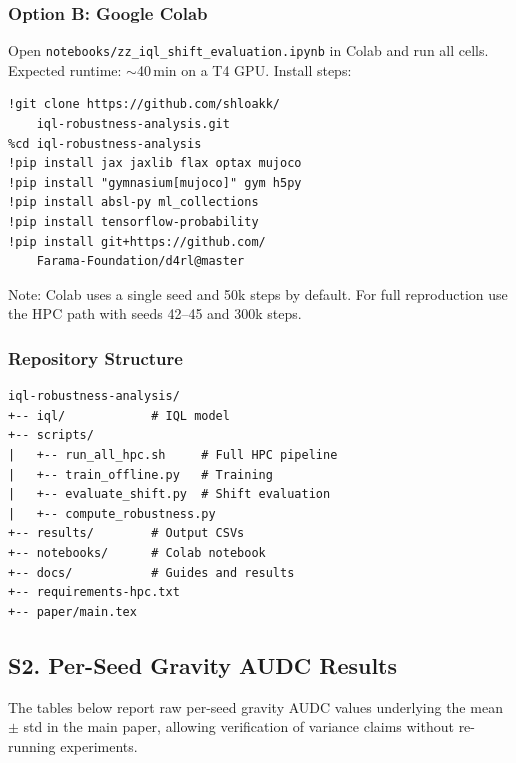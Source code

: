 \documentclass[conference]{IEEEtran}
\begin{document}
\subsubsection*{Option B: Google Colab}

Open \texttt{notebooks/zz\_iql\_shift\_evaluation.ipynb} in Colab
and run all cells. Expected runtime: $\sim$40\,min on a T4 GPU.
Install steps:

\begin{verbatim}
!git clone https://github.com/shloakk/
    iql-robustness-analysis.git
%cd iql-robustness-analysis
!pip install jax jaxlib flax optax mujoco
!pip install "gymnasium[mujoco]" gym h5py
!pip install absl-py ml_collections
!pip install tensorflow-probability
!pip install git+https://github.com/
    Farama-Foundation/d4rl@master
\end{verbatim}

Note: Colab uses a single seed and 50k steps by default. For full
reproduction use the HPC path with seeds 42--45 and 300k steps.

\subsubsection*{Repository Structure}

\begin{verbatim}
iql-robustness-analysis/
+-- iql/            # IQL model
+-- scripts/
|   +-- run_all_hpc.sh     # Full HPC pipeline
|   +-- train_offline.py   # Training
|   +-- evaluate_shift.py  # Shift evaluation
|   +-- compute_robustness.py
+-- results/        # Output CSVs
+-- notebooks/      # Colab notebook
+-- docs/           # Guides and results
+-- requirements-hpc.txt
+-- paper/main.tex
\end{verbatim}


\subsection*{S2. Per-Seed Gravity AUDC Results}

The tables below report raw per-seed gravity AUDC values underlying
the mean $\pm$ std in the main paper, allowing verification of
variance claims without re-running experiments.
\end{document}
